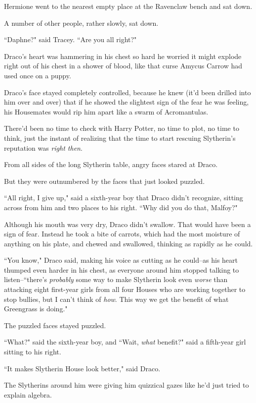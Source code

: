 Hermione went to the nearest empty place at the Ravenclaw bench and sat down.

A number of other people, rather slowly, sat down.

``Daphne?" said Tracey. ``Are you all right?"

\later

Draco's heart was hammering in his chest so hard he worried it might explode right out of his chest in a shower of blood, like that curse Amycus Carrow had used once on a puppy.

Draco's face stayed completely controlled, because he knew (it'd been drilled into him over and over) that if he showed the slightest sign of the fear he was feeling, his Housemates would rip him apart like a swarm of Acromantulas.

There'd been no time to check with Harry Potter, no time to plot, no time to think, just the instant of realizing that the time to start rescuing Slytherin's reputation was \emph{right then}.

From all sides of the long Slytherin table, angry faces stared at Draco.

But they were outnumbered by the faces that just looked puzzled.

``All right, I give up," said a sixth-year boy that Draco didn't recognize, sitting across from him and two places to his right. ``Why did you do that, Malfoy?"

Although his mouth was very dry, Draco didn't swallow. That would have been a sign of fear. Instead he took a bite of carrots, which had the most moisture of anything on his plate, and chewed and swallowed, thinking as rapidly as he could.

``You know," Draco said, making his voice as cutting as he could\---as his heart thumped even harder in his chest, as everyone around him stopped talking to listen\---``there's \emph{probably} some way to make Slytherin look even \emph{worse} than attacking eight first-year girls from all four Houses who are working together to stop bullies, but I can't think of \emph{how}. This way we get the benefit of what Greengrass is doing."

The puzzled faces stayed puzzled.

``What?" said the sixth-year boy, and ``Wait, \emph{what} benefit?" said a fifth-year girl sitting to his right.

``It makes Slytherin House look better," said Draco.

The Slytherins around him were giving him quizzical gazes like he'd just tried to explain algebra.

